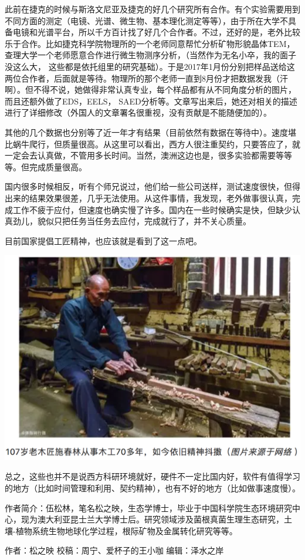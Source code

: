 \documentclass[]{book}
\begin{document}
此前在捷克的时候与斯洛文尼亚及捷克的好几个研究所有合作。有个实验需要用到不同方面的测定（电镜、光谱、微生物、基本理化测定等等），由于所在大学不具备电镜和光谱平台，所以千方百计找了好几个合作者。不过，还好的是，老外比较乐于合作。比如捷克科学院物理所的一个老师同意帮忙分析矿物形貌晶体TEM，查理大学一个老师愿意合作进行微生物测序分析，（当然作为无名小卒，我的面子没这么大，
这些都是依托组里的研究基础）。于是2017年1月份分别把样品送给这两位合作者，后面就是等待。物理所的那个老师一直到8月份才把数据发我（汗啊）。但不得不说，她做得非常认真专业，每个样品都有从不同角度分析的图片，而且还额外做了EDS，EELS，
SAED分析等。文章写出来后，她还对相关的描述进行了详细修改（外国人的文章署名很重视，没有贡献是不能随便加的）。

其他的几个数据也分别等了近一年才有结果（目前依然有数据在等待中）。速度堪比蜗牛爬行，但质量很高。从这里可以看出，西方人很注重契约，只要答应了，就一定会去认真做，不管用多长时间。当然，澳洲这边也是，很多实验都需要等等等。但完成质量很高。

国内很多时候相反，听有个师兄说过，他们给一些公司送样，测试速度很快，但得出来的结果效果很差，几乎无法使用。从这件事情，我发现，老外做事很认真，完成工作不疲于应付，但速度也确实慢了许多。国内在一些时候确实是快，但缺少认真劲儿，貌似只把任务当任务去应付，完成就行了，并不关心质量。

目前国家提倡工匠精神，也应该就是看到了这一点吧。

\includegraphics[width=8.33in]{images/osre5}

总之，这些也并不是说西方科研环境就好，硬件不一定比国内好，软件有值得学习的地方（比如时间管理和利用、契约精神），也有不好的地方（比如做事速度慢）。

作者简介：伍松林，笔名松之映，生态学博士，毕业于中国科学院生态环境研究中心，现为澳大利亚昆士兰大学博士后。研究领域涉及菌根真菌生理生态研究，土壤-植物系统生物地球化学过程，根际矿物及金属转化研究等等。

作者：松之映 校稿：周宁、爱杯子的王小咖 编辑：泽水之岸


\end{document}
